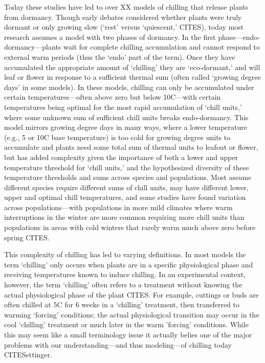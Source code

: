 \documentclass[11pt]{article}
\begin{document}
Today these studies have led to over XX models of chilling that release plants from dormancy. Though early debates considered whether plants were truly dormant or only growing slow (`rest' versus `quiescent,' CITES), today most research assumes a model with two phases of dormancy. In the first phase---endo-dormancy---plants wait for complete chilling accumulation and cannot respond to external warm periods (thus the `endo' part of the term). Once they have accumulated the appropriate amount of `chilling' they are `eco-dormant,' and will leaf or flower in response to a sufficient thermal sum (often called `growing degree days' in some models). In these models, chilling can only be accumulated under certain temperatures---often above zero but below 10\degree C---with certain temperatures being optimal for the most rapid accumulation of `chill units,' where some unknown sum of sufficient chill units breaks endo-dormancy. This model mirrors growing degree days in many ways, where a lower temperature (e.g., 5 or 10\degree C base temperature) is too cold for growing degree units to accumulate and plants need some total sum of thermal units to leafout or flower, but has added complexity given the importance of both a lower and upper temperature threshold for `chill units,' and the hypothesized diversity of these temperature thresholds and sums across species and populations. Most assume different species require different sums of chill units, may have different lower, upper and optimal chill temperatures, and some studies have found variation across populations---with populations in more mild climates where warm interruptions in the winter are more common requiring more chill units than populations in areas with cold winters that rarely warm much above zero before spring CITES. 

This complexity of chilling has led to varying definitions. In most models the term `chilling' only occurs when plants are in a specific physiological phase and receiving temperatures known to induce chilling. In an experimental context, however, the term `chilling' often refers to a treatment without knowing the actual physiological phase of the plant CITES. For example, cuttings or buds are often chilled at 5\degree C for 6 weeks in a `chilling' treatment, then transferred to warming `forcing' conditions; the actual physiological transition may occur in the cool `chilling' treatment or much later in the warm 'forcing' conditions. While this may seem like a small terminology issue it actually belies one of the major problems with our understanding---and thus modeling---of chilling today CITESettinger. 
\end{document}
